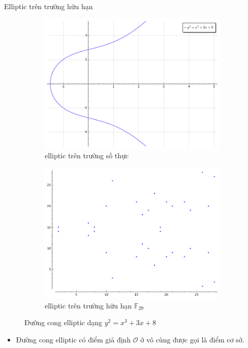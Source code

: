 \documentclass[compress]{beamer}
\begin{document}
\begin{frame}{Elliptic trên trường hữu hạn}
\begin{figure}[h]
\begin{subfigure}{.5\textwidth}
  \centering
  \includegraphics[width=1\linewidth]{../im11.png}
  \caption{elliptic trên trường số thực}
  \label{fig:sfig1}
\end{subfigure}%
\begin{subfigure}{.5\textwidth}
  \centering
  \includegraphics[width=1\linewidth]{../im12.png}
  \caption*{elliptic trên trường hữu hạn $\mathbb{F}_{29}$}
  \label{fig:sfig2}
\end{subfigure}
\caption{Đường cong elliptic dạng $y^2 = x^3 + 3x + 8$}
\label{fig:fig}
\end{figure}
\begin{itemize}
\item Đường cong elliptic có điểm giả định $\mathcal{O}$ ở vô cùng được gọi là điểm cơ sở.
\end{itemize}
\end{frame}
\end{document}
